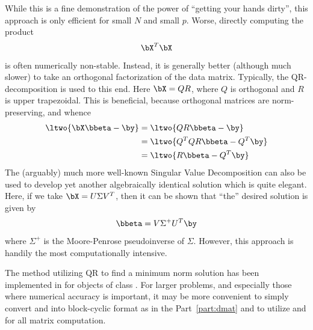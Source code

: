 While this is a fine demonstration of the power of ``getting your hands dirty'', this approach is only efficient for small $N$ and small $p$.  Worse, directly computing the product
\begin{align*}
\bX^T\bX
\end{align*}
is often numerically non-stable.  Instead, it is generally better (although much slower) to take an orthogonal factorization of the data matrix.  Typically, the QR-decomposition is used to this end.  Here $\bX=QR$, where $Q$ is orthogonal and $R$ is upper trapezoidal.  This is beneficial, because orthogonal matrices are norm-preserving, and whence
\begin{align*}
\ltwo{\bX\bbeta - \by} &= \ltwo{QR\bbeta - \by}\\
  &= \ltwo{Q^TQR\bbeta - Q^T\by}\\
  &= \ltwo{R\bbeta - Q^T\by}
\end{align*}
The (arguably) much more well-known Singular Value Decomposition can also be used to develop yet another algebraically identical solution which is quite elegant.  Here, if we take $\bX = U\Sigma V^T$, then it can be shown that ``the'' desired solution is given by
\begin{align*}
\bbeta = V\Sigma^+ U^T\by
\end{align*}
where $\Sigma^+$ is the Moore-Penrose pseudoinverse of $\Sigma$.  However, this approach is handily the most computationally intensive.

The method utilizing QR to find a minimum norm solution has been implemented in  for objects of class .  For larger problems, and especially those where numerical accuracy is important, it may be more convenient to simply convert  and  into block-cyclic format as in the Part~\ref{part:dmat} and
to utilize  and  for all matrix computation.

